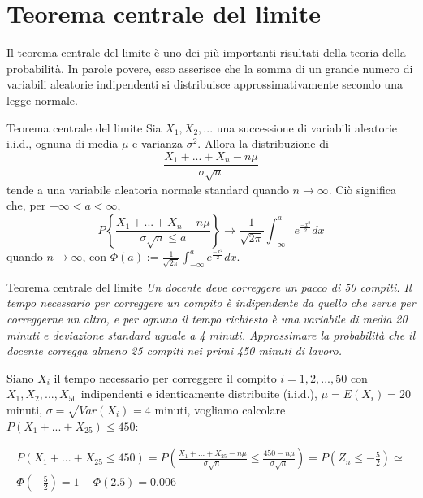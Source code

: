 \section{Teorema centrale del limite}
Il teorema centrale del limite è uno dei più importanti risultati della teoria della probabilità. In parole povere, esso asserisce che la somma di un grande numero di variabili aleatorie indipendenti si distribuisce approssimativamente secondo una legge normale.
\begin{Thm}{Teorema centrale del limite}{}
    Sia $X_1,X_2,...$ una successione di variabili aleatorie i.i.d., ognuna di media $\mu$ e varianza $\sigma^2$. Allora la distribuzione di
    \begin{equation*}
        \frac{X_1+...+X_n-n\mu}{\sigma\sqrt{n}}
    \end{equation*}
    tende a una variabile aleatoria normale standard quando $n\to\infty$. Ciò significa che, per $-\infty<a<\infty$,
    \begin{equation*}
        P\left\{\frac{X_1+...+X_n-n\mu}{\sigma\sqrt{n}\leq a}\right\}\to\frac{1}{\sqrt{2\pi}}\int^a_{-\infty}e^{\frac{-x^2}{2}}dx
    \end{equation*}
    quando $n\to\infty$, con $\Phi(a):=\frac{1}{\sqrt{2\pi}}\int^a_{-\infty}e^{\frac{-x^2}{2}}dx$.
\end{Thm}

\begin{Example}{Teorema centrale del limite}{}
    \textit{Un docente deve correggere un pacco di 50 compiti. Il tempo necessario per correggere un compito è indipendente da quello che serve per correggerne un altro, e per ognuno il tempo richiesto è una variabile di media 20 minuti e deviazione standard uguale a 4 minuti. Approssimare la probabilità che il docente corregga almeno 25 compiti nei primi 450 minuti di lavoro.}

    Siano $X_i$ il tempo necessario per correggere il compito $i=1,2,...,50$ con $X_1, X_2,...,X_{50}$ indipendenti e identicamente distribuite (i.i.d.), $\mu=E(X_i)=20$ minuti, $\sigma=\sqrt{Var(X_i)}=4$ minuti, vogliamo calcolare $P(X_1+...+X_{25})\leq450$:

    \begin{align*}
        P(X_1+...+X_{25}\leq450)=P\left(\frac{X_1+...+X_{25}-n\mu}{\sigma\sqrt{n}}\leq\frac{450-n\mu}{\sigma\sqrt{n}}\right)=P\left(Z_n\leq -\frac{5}{2}\right)\simeq\\\Phi\left(-\frac{5}{2}\right)=1-\Phi(2.5)=0.006
    \end{align*}
\end{Example}

